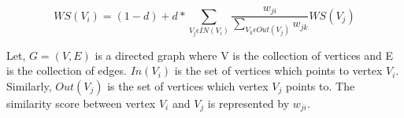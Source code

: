 \begin{equation}
\label{eq:textrank}
    WS(V_i) = (1 - d) + d * \sum_{V_j\epsilon IN(V_i) } \frac{w_{ji}}{\sum_{V_k \epsilon Out(V_j)} w_{jk}}  WS(V_j)
\end{equation}

Let, $ G = (V, E)$ is a directed graph where V is the collection of vertices and E is the collection of edges. $In(V_i)$ is the set of vertices which points to vertex $V_i$. Similarly, $Out(V_j)$ is the set of vertices which vertex $V_j$ points to. The similarity score between vertex $V_i$ and $V_j$ is represented by $w_{ji}$. 








